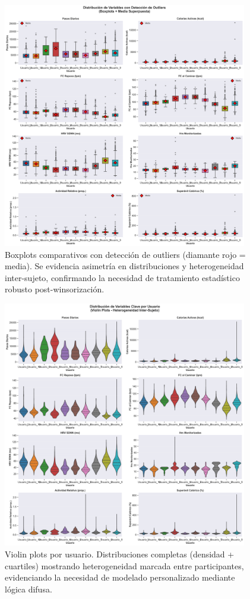 \documentclass[12pt,letterpaper,twoside]{report}
\begin{document}
\begin{figure}[htbp]
\centering
\includegraphics[width=0.95\textwidth]{../analisis_u/descriptivos_visuales/boxplots_comparativos.png}
\caption{Boxplots comparativos con detección de outliers (diamante rojo = media). Se evidencia asimetría en distribuciones y heterogeneidad inter-sujeto, confirmando la necesidad de tratamiento estadístico robusto post-winsorización.}
\label{fig:boxplots_comparativos}
\end{figure}

\begin{figure}[htbp]
\centering
\includegraphics[width=0.95\textwidth]{../analisis_u/descriptivos_visuales/violin_plots_por_usuario.png}
\caption{Violin plots por usuario. Distribuciones completas (densidad + cuartiles) mostrando heterogeneidad marcada entre participantes, evidenciando la necesidad de modelado personalizado mediante lógica difusa.}
\label{fig:violin_plots}
\end{figure}
\end{document}
